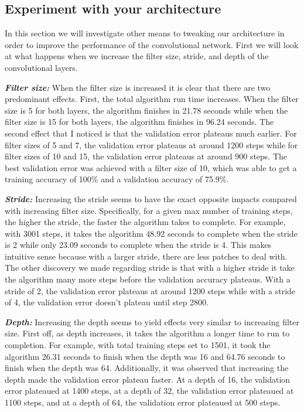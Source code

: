 \documentclass{article}
\begin{document}
\subsection{Experiment with your architecture}
In this section we will investigate other means to tweaking our architecture in order to improve the performance of the convolutional network. First we will look at what happens when we increase the filter size, stride, and depth of the convolutional layers. 

\textbf{\textit{Filter size:}}
When the filter size is increased it is clear that there are two predominant effects. First, the total algorithm run time increases. When the filter size is 5 for both layers, the algorithm finishes in 21.78 seconds while when the filter size is 15 for both layers, the algorithm finishes in 96.24 seconds. The second effect that I noticed is that the validation error plateaus much earlier. For filter sizes of 5 and 7, the validation error plateaus at around 1200 steps while for filter sizes of 10 and 15, the validation error plateaus at around 900 steps. The best validation error was achieved with a filter size of 10, which was able to get a training accuracy of 100\% and a validation accuracy of 75.9\%.

\textbf{\textit{Stride:}}
Increasing the stride seems to have the exact opposite impacts compared with increasing filter size. Specifically, for a given max number of training steps, the higher the stride, the faster the algorithm takes to complete. For example, with 3001 steps, it takes the algorithm 48.92 seconds to complete when the stride is 2 while only 23.09 seconds to complete when the stride is 4. This makes intuitive sense because with a larger stride, there are less patches to deal with. The other discovery we made regarding stride is that with a higher stride it take the algorithm many more steps before the validation accuracy plateaus. With a stride of 2, the validation error plateaus at around 1200 steps while with a stride of 4, the validation error doesn't plateau until step 2800.

\textbf{\textit{Depth:}}
Increasing the depth seems to yield effects very similar to increasing filter size. First off, as depth increases, it takes the algorithm a longer time to run to completion. For example, with total training steps set to 1501, it took the algorithm 26.31 seconds to finish when the depth was 16 and 64.76 seconds to finish when the depth was 64. Additionally, it was observed that increasing the depth made the validation error plateau faster. At a depth of 16, the validation error plateaued at 1400 steps, at a depth of 32, the validation error plateaued at 1100 steps, and at a depth of 64, the validation error plateaued at 500 steps. 
\end{document}
